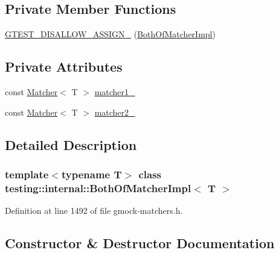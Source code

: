 \subsection*{Private Member Functions}
\begin{DoxyCompactItemize}
\item 
\hyperlink{classtesting_1_1internal_1_1BothOfMatcherImpl_a4d50ba5d71e949b96f69812bb48a6760}{G\+T\+E\+S\+T\+\_\+\+D\+I\+S\+A\+L\+L\+O\+W\+\_\+\+A\+S\+S\+I\+G\+N\+\_\+} (\hyperlink{classtesting_1_1internal_1_1BothOfMatcherImpl}{Both\+Of\+Matcher\+Impl})
\end{DoxyCompactItemize}
\subsection*{Private Attributes}
\begin{DoxyCompactItemize}
\item 
const \hyperlink{classtesting_1_1Matcher}{Matcher}$<$ T $>$ \hyperlink{classtesting_1_1internal_1_1BothOfMatcherImpl_a31f8739f880776e209a3e5bd96ddfbf6}{matcher1\+\_\+}
\item 
const \hyperlink{classtesting_1_1Matcher}{Matcher}$<$ T $>$ \hyperlink{classtesting_1_1internal_1_1BothOfMatcherImpl_aeb19d68ac4732ad2ca45a9d37ad955cb}{matcher2\+\_\+}
\end{DoxyCompactItemize}


\subsection{Detailed Description}
\subsubsection*{template$<$typename T$>$\newline
class testing\+::internal\+::\+Both\+Of\+Matcher\+Impl$<$ T $>$}



Definition at line 1492 of file gmock-\/matchers.\+h.



\subsection{Constructor \& Destructor Documentation}
\mbox{\label{classtesting_1_1internal_1_1BothOfMatcherImpl_a41760fcb35ba18ac2a0eb580ac61ea9a}} 
